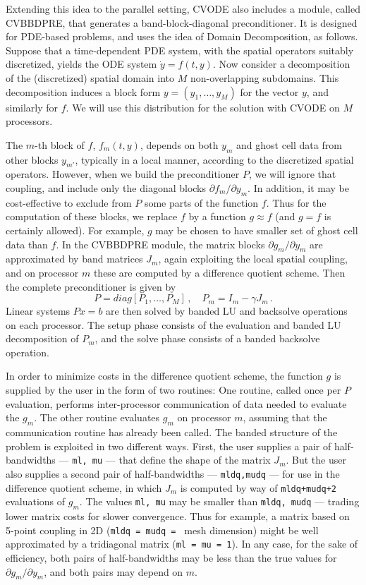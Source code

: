 Extending this idea to the parallel setting, CVODE also includes a
module, called CVBBDPRE, that generates a band-block-diagonal
preconditioner.  It is designed for PDE-based problems, and uses the
idea of Domain Decomposition, as follows.  Suppose that a
time-dependent PDE system, with the spatial operators suitably
discretized, yields the ODE system $\dot{y} = f(t,y)$.  Now consider a
decomposition of the (discretized) spatial domain into $M$
non-overlapping subdomains.  This decomposition induces a block form
$y = (y_1,\ldots,y_M)$ for the vector $y$, and similarly for $f$.  We
will use this distribution for the solution with CVODE on $M$
processors.

The $m$-th block of $f$, $f_m(t,y)$, depends on both $y_m$ and ghost
cell data from other blocks $y_{m'}$, typically in a local manner,
according to the discretized spatial operators.  However, when we
build the preconditioner $P$, we will ignore that coupling, and
include only the diagonal blocks $\partial f_m / \partial y_m$.  In
addition, it may be cost-effective to exclude from $P$ some parts of
the function $f$.  Thus for the computation of these blocks, we
replace $f$ by a function $g \approx f$ (and $g = f$ is certainly
allowed).  For example, $g$ may be chosen to have smaller set of ghost
cell data than $f$.  In the CVBBDPRE module, the matrix blocks
$\partial g_m/\partial y_m$ are approximated by band matrices $J_m$,
again exploiting the local spatial coupling, and on processor $m$
these are computed by a difference quotient scheme.  Then the complete
preconditioner is given by
\begin{equation*}
  P = diag[P_1,\ldots,P_M] \, , \quad 
  P_m = I_m - \gamma J_m \, . 
\end{equation*}
Linear systems $Px = b$ are then solved by banded LU and backsolve
operations on each processor.  The setup phase consists of the
evaluation and banded LU decomposition of $P_m$, and the solve phase
consists of a banded backsolve operation.

In order to minimize costs in the difference quotient scheme, the
function $g$ is supplied by the user in the form of two routines: One
routine, called once per $P$ evaluation, performs inter-processor
communication of data needed to evaluate the $g_m$.  The other routine
evaluates $g_m$ on processor $m$, assuming that the communication
routine has already been called.  The banded structure of the problem
is exploited in two different ways.  First, the user supplies a pair of
half-bandwidths --- {\tt ml, mu} --- that define the shape of the
matrix $J_m$.  But the user also supplies a second pair of
half-bandwidths --- {\tt mldq,mudq} --- for use in the difference
quotient scheme, in which $J_m$ is computed by way of 
{\tt mldq+mudq+2} evaluations of $g_m$.  The values {\tt ml, mu} may be
smaller than {\tt mldq, mudq} --- trading lower matrix costs for slower
convergence.  Thus for example, a matrix based on 5-point coupling in
2D ({\tt mldq = mudq = } mesh dimension) might be well approximated by
a tridiagonal matrix ({\tt ml = mu = 1}).  In any case, for the sake
of efficiency, both pairs of half-bandwidths may be less than the true
values for $\partial g_m /\partial y_m$, and both pairs may depend on
$m$.

